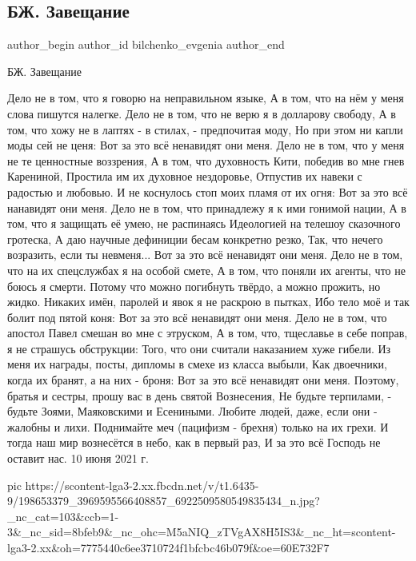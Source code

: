  
 
 
 
 
 
\subsection{БЖ. Завещание}
\label{sec:10_06_2021.fb.bilchenko_evgenia.4.zaveschanie}
\ifcmt
 author_begin
   author_id bilchenko_evgenia
 author_end
\fi

БЖ. Завещание

Дело не в том, что я говорю на неправильном языке,
А в том, что на нём у меня слова пишутся налегке.
Дело не в том, что не верю я в долларову свободу,
А в том, что хожу не в лаптях - в стилах, - предпочитая моду,
Но при этом ни капли моды сей не ценя:
Вот за это всё ненавидят они меня.
Дело не в том, что у меня не те ценностные воззрения,
А в том, что духовность Кити, победив во мне гнев Карениной,
Простила им их духовное нездоровье,
Отпустив их навеки с радостью и любовью.
И не коснулось стоп моих пламя от их огня:
Вот за это всё нанавидят они меня.
Дело не в том, что принадлежу я к ими гонимой нации,
А в том, что я защищать её умею, не распинаясь
Идеологией на телешоу сказочного гротеска,
А даю научные дефиниции бесам конкретно резко,
Так, что нечего возразить, если ты невменя...
Вот за это всё ненавидят они меня.
Дело не в том, что на их спецслужбах я на особой смете,
А в том, что поняли их агенты, что не боюсь я смерти.
Потому что можно погибнуть твёрдо, а можно прожить, но жидко.
Никаких имён, паролей и явок я не раскрою в пытках,
Ибо тело моё и так болит под пятой коня:
Вот за это всё ненавидят они меня.
Дело не в том, что апостол Павел смешан во мне с этруском,
А в том, что, тщеславье в себе поправ, я не страшусь обструкции:
Того, что они считали наказанием хуже гибели.
Из меня их награды, посты, дипломы в смехе из класса выбыли,
Как двоечники, когда их бранят, а на них - броня:
Вот за это всё ненавидят они меня.
Поэтому, братья и сестры, прошу вас в день святой Вознесения,
Не будьте терпилами, - будьте Зоями, Маяковскими и Есениными.
Любите людей, даже, если они - жалобны и лихи.
Поднимайте меч (пацифизм - брехня) только на их грехи.
И тогда наш мир вознесётся в небо, как в первый раз,
И за это всё Господь не оставит нас.
10 июня 2021 г.

\ifcmt
  pic https://scontent-lga3-2.xx.fbcdn.net/v/t1.6435-9/198653379_3969595566408857_6922509580549835434_n.jpg?_nc_cat=103&ccb=1-3&_nc_sid=8bfeb9&_nc_ohc=M5aNIQ_zTVgAX8H5IS3&_nc_ht=scontent-lga3-2.xx&oh=7775440c6ee3710724f1bfcbc46b079f&oe=60E732F7
\fi
